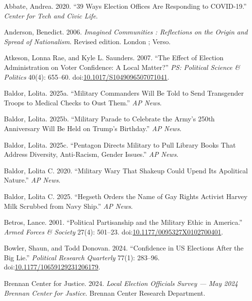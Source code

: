 \documentclass[
  12pt,
  letterpaper,
]{article}
\newlength{\cslhangindent}
\newenvironment{CSLReferences}[2] %
 {\begin{list}{}{%
  \setlength{\itemindent}{0pt}
  \setlength{\leftmargin}{0pt}
  \setlength{\parsep}{0pt}
  \ifodd #1
   \setlength{\leftmargin}{\cslhangindent}
   \setlength{\itemindent}{-1\cslhangindent}
  \fi
  \setlength{\itemsep}{#2\baselineskip}}}
 {\end{list}}
\begin{document}
\label{refs}
\begin{CSLReferences}{1}{1}
Abbate, Andrea. 2020. {``39 {Ways Election Offices} Are {Responding} to
{COVID-19}.''} \emph{Center for Tech and Civic Life}.

Anderson, Benedict. 2006. \emph{Imagined Communities : Reflections on
the Origin and Spread of Nationalism}. Revised edition. London ; Verso.

Atkeson, Lonna Rae, and Kyle L. Saunders. 2007. {``The {Effect} of
{Election Administration} on {Voter Confidence}: {A Local Matter}?''}
\emph{PS: Political Science \& Politics} 40(4): 655--60.
doi:\href{https://doi.org/10.1017/S1049096507071041}{10.1017/S1049096507071041}.

Baldor, Lolita. 2025a. {``Military Commanders Will Be Told to Send
Transgender Troops to Medical Checks to Oust Them.''} \emph{AP News}.

Baldor, Lolita. 2025b. {``Military Parade to Celebrate the {Army}'s
250th Anniversary Will Be Held on {Trump}'s Birthday.''} \emph{AP News}.

Baldor, Lolita. 2025c. {``Pentagon Directs Military to Pull Library
Books That Address Diversity, Anti-Racism, Gender Issues.''} \emph{AP
News}.

Baldor, Lolita C. 2020. {``Military Wary That Shakeup Could Upend Its
Apolitical Nature.''} \emph{AP News}.

Baldor, Lolita C. 2025. {``Hegseth Orders the Name of Gay Rights
Activist {Harvey Milk} Scrubbed from {Navy} Ship.''} \emph{AP News}.

Betros, Lance. 2001. {``Political {Partisanship} and the {Military
Ethic} in {America}.''} \emph{Armed Forces \& Society} 27(4): 501--23.
doi:\href{https://doi.org/10.1177/0095327X0102700401}{10.1177/0095327X0102700401}.

Bowler, Shaun, and Todd Donovan. 2024. {``Confidence in {US Elections
After} the {Big Lie}.''} \emph{Political Research Quarterly} 77(1):
283--96.
doi:\href{https://doi.org/10.1177/10659129231206179}{10.1177/10659129231206179}.

Brennan Center for Justice. 2024. \emph{Local {Election Officials
Survey} --- {May} 2024 {\textbar} {Brennan Center} for {Justice}}.
Brennan Center Research Department.


\end{CSLReferences}
\end{document}
